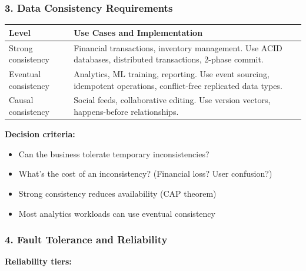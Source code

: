 \subsubsection{3. Data Consistency Requirements}

\begin{tabular}{|p{3cm}|p{10cm}|}
\hline
\textbf{Level} & \textbf{Use Cases and Implementation} \\
\hline
Strong consistency & Financial transactions, inventory management. Use ACID databases, distributed transactions, 2-phase commit. \\
\hline
Eventual consistency & Analytics, ML training, reporting. Use event sourcing, idempotent operations, conflict-free replicated data types. \\
\hline
Causal consistency & Social feeds, collaborative editing. Use version vectors, happens-before relationships. \\
\hline
\end{tabular}

\textbf{Decision criteria:}
\begin{itemize}
    \item Can the business tolerate temporary inconsistencies?
    \item What's the cost of an inconsistency? (Financial loss? User confusion?)
    \item Strong consistency reduces availability (CAP theorem)
    \item Most analytics workloads can use eventual consistency
\end{itemize}

\subsubsection{4. Fault Tolerance and Reliability}

\textbf{Reliability tiers:}

